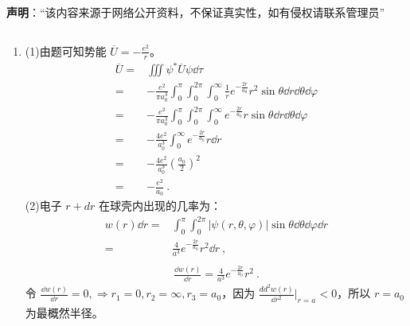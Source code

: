 
\textbf{声明}：“该内容来源于网络公开资料，不保证真实性，如有侵权请联系管理员”

\begin{issues}
\issueDraft
\end{issues}


\subsection{ }
\begin{enumerate}
\item 
(1)由题可知势能 $\displaystyle \overline{U}=-\frac{e^2}{r}$。
\begin{equation}
\begin{aligned}
\overline{U}=&\iiint \psi^{*} \overline{U} \psi \dd{\tau}\\
=&-\frac{e^2}{\pi a^{3}_{0}}\int^{\pi}_{0}\int^{2\pi}_{0}\int^{\infty}_{0} \frac{1}{r}e^{-\frac{2r}{a_0}}r^{2}\sin{\theta} \dd{r}\dd{\theta}\dd{\varphi}\\
=&-\frac{e^{2}}{\pi a^{3}_{0}}\int^{\pi}_{0}\int^{2\pi}_{0}\int^{\infty}_{0} e^{-\frac{2r}{a_0}}r\sin{\theta} \dd{r}\dd{\theta}\dd{\varphi}\\
=&-\frac{4 e^2}{a^{3}_{0}}\int^{\infty}_{0}e^{-\frac{2r}{a_0}}r\dd{r}\\
=&-\frac{4e^{2}}{a^{3}_{0}}(\frac{a_{0}}{2})^2\\
=&-\frac{e^{2}}{a_{0}}~.
\end{aligned}
\end{equation}
(2)电子 $r+dr$ 在球壳内出现的几率为：\\
\begin{equation}
\begin{aligned}
w(r)\dd{r}=&\int^{\pi}_{0}\int^{2\pi}_{0} \lvert \psi(r,\theta,\varphi) \rvert \sin{\theta}\dd{\theta}\dd{\varphi}\dd{r}\\
=&\frac{4}{a^{3}}e^{-\frac{2r}{a_0}}r^2 \dd{r}~,\\
\end{aligned}
\end{equation}
\begin{equation}
\begin{aligned}
\frac{\dd{w(r)}}{\dd{r}}=\frac{4}{a^{3}}e^{-\frac{2r}{a_0}}r^2 ~.
\end{aligned}
\end{equation}
令 $\displaystyle \frac{\dd{w(r)}}{\dd{r}}=0,\Longrightarrow r_1 = 0,r_2 = \infty,r_3 = a_0$，因为 $\displaystyle \frac{dd^{2}{w(r)}}{\dd{r^{2}}}|_{r = a_{}} < 0$，所以 $r = a_0$ 为最概然半径。


\end{enumerate}
